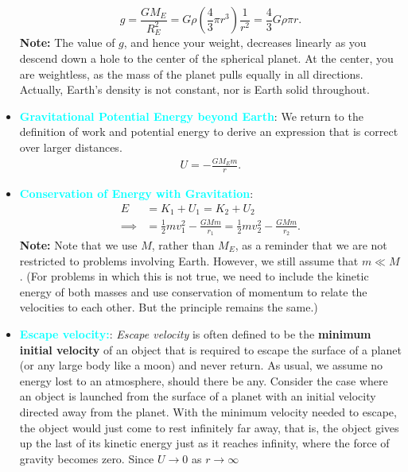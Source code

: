 \documentclass{report}
\begin{document}
\begin{itemize}
            \[ g = \frac{G M_E}{R_E^2} = G \rho \left( \frac{4}{3} \pi r^3 \right) \frac{1}{r^2} = \frac{4}{3} G \rho \pi r. \]
            \bigbreak \noindent 
            \textbf{Note:} The value of $g$, and hence your weight, decreases linearly as you descend down a hole to the center of the spherical planet. At the center, you are weightless, as the mass of the planet pulls equally in all directions.
            \bigbreak \noindent 
            Actually, Earth’s density is not constant, nor is Earth solid throughout.
        \item \textbf{\textcolor{cyan}{Gravitational Potential Energy beyond Earth}}: We return to the definition of work and potential energy to derive an expression that is correct over larger distances.
            \begin{align*}
                U = - \frac{GM_{E}m}{r}
            .\end{align*}
        \item \textbf{\textcolor{cyan}{Conservation of Energy with Gravitation}}:
            \begin{align*}
                E &= K_{1} + U_{1} = K_{2} + U_{2}\\
                \implies &= \frac{1}{2}mv_{1}^{2} - \frac{GMm}{r_{1}} = \frac{1}{2}mv_{2}^{2} - \frac{GMm}{r_{2}}
            .\end{align*}
            \bigbreak \noindent 
            \textbf{Note:}
            Note that we use \(M\), rather than \(M_{E}\), as a reminder that we are not restricted to problems involving Earth. However, we still assume that \(m \ll M\). (For problems in which this is not true, we need to include the kinetic energy of both masses and use conservation of momentum to relate the velocities to each other. But the principle remains the same.)
        \item \textbf{\textcolor{cyan}{Escape velocity:}}:
            \textit{Escape velocity} is often defined to be the \textbf{minimum initial velocity} of an object that is required to escape the surface of a planet (or any large body like a moon) and never return. As usual, we assume no energy lost to an atmosphere, should there be any.
            \bigbreak \noindent 
            Consider the case where an object is launched from the surface of a planet with an initial velocity directed away from the planet. With the minimum velocity needed to escape, the object would just come to rest infinitely far away, that is, the object gives up the last of its kinetic energy just as it reaches infinity, where the force of gravity becomes zero. Since $U \rightarrow 0 $ as $r \rightarrow \infty $

\end{itemize}
\end{document}
